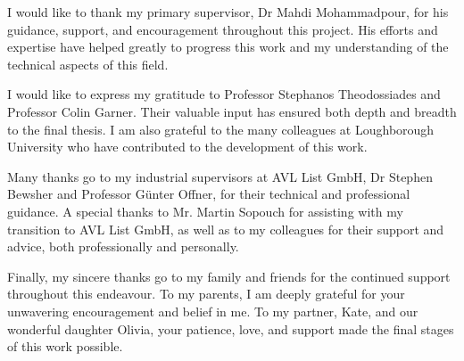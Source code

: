 
\begin{acknowledgements}      

I would like to thank my primary supervisor, Dr Mahdi Mohammadpour, for his guidance, support, and encouragement throughout this project. His efforts and expertise have helped greatly to progress this work and my understanding of the technical aspects of this field.

I would like to express my gratitude to Professor Stephanos Theodossiades and Professor Colin Garner. Their valuable input has ensured both depth and breadth to the final thesis. I am also grateful to the many colleagues at Loughborough University who have contributed to the development of this work.

Many thanks go to my industrial supervisors at AVL List GmbH, Dr Stephen Bewsher and Professor Günter Offner, for their technical and professional guidance. A special thanks to Mr. Martin Sopouch for assisting with my transition to AVL List GmbH, as well as to my colleagues for their support and advice, both professionally and personally. 

Finally, my sincere thanks go to my family and friends for the continued support throughout this endeavour. To my parents, I am deeply grateful for your unwavering  encouragement and belief in me. To my partner, Kate, and our wonderful daughter Olivia, your patience, love, and support made the final stages of this work possible.

\end{acknowledgements}
